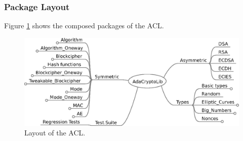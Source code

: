 \subsubsection{Package Layout}
Figure \ref{Layout_of_ACL} shows the composed packages of the ACL.
\begin{figure}[h]
  \centering
  \includegraphics[scale=0.9]{./images/Layout_of_the_ACL.eps}
  \caption{Layout of the ACL.} \label{Layout_of_ACL}
\end{figure}
